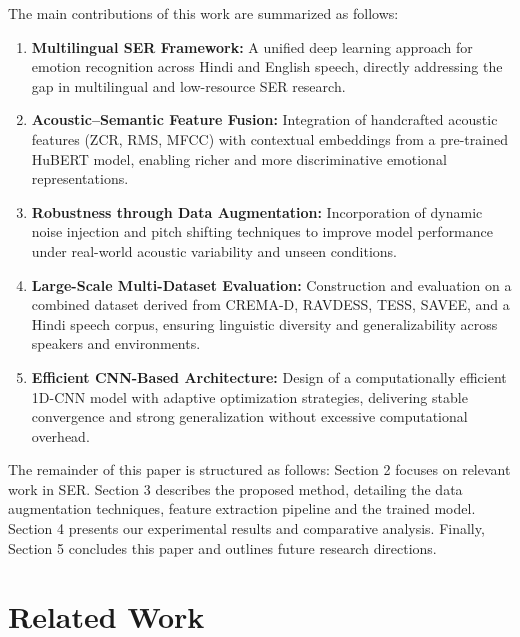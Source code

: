 \documentclass[iicol,sn-mathphys-num]{sn-jnl}%
\theoremstyle{thmstyleone}%
\theoremstyle{thmstyletwo}%
\theoremstyle{thmstylethree}%
\begin{document}
The main contributions of this work are summarized as follows:
\begin{enumerate}

 \item \textbf{Multilingual SER Framework:} A unified deep learning approach for emotion recognition across Hindi and English speech, directly addressing the gap in multilingual and low-resource SER research.
\item \textbf{Acoustic--Semantic Feature Fusion:} Integration of handcrafted acoustic features (ZCR, RMS, MFCC) with contextual embeddings from a pre-trained HuBERT model, enabling richer and more discriminative emotional representations.
\item \textbf{Robustness through Data Augmentation:} Incorporation of dynamic noise injection and pitch shifting techniques to improve model performance under real-world acoustic variability and unseen conditions.
\item \textbf{Large-Scale Multi-Dataset Evaluation:} Construction and evaluation on a combined dataset derived from CREMA-D, RAVDESS, TESS, SAVEE, and a Hindi speech corpus, ensuring linguistic diversity and generalizability across speakers and environments.

 \item \textbf{Efficient CNN-Based Architecture:} Design of a computationally efficient 1D-CNN model with adaptive optimization strategies, delivering stable convergence and strong generalization without excessive computational overhead.
\end{enumerate}
The remainder of this paper is structured as follows: Section 2 focuses on relevant work in SER. Section 3 describes the proposed method, detailing the data augmentation techniques, feature extraction pipeline and the trained model. Section 4 presents our experimental results and comparative analysis. Finally, Section 5 concludes this paper and outlines future research directions.

\section{Related Work}\label{sec2}
\end{document}
